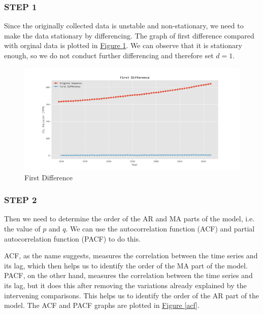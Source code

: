 \documentclass[12pt,a4paper]{article}
\begin{document}
    \subsubsection*{STEP 1}
    Since the originally collected data is unstable and non-stationary, we need to make the data stationary by differencing. The graph of first difference compared with orginal data is plotted in \hyperref[first_diff]{Figure \ref*{first_diff}}. We can observe that it is stationary enough, so we do not conduct further differencing and therefore set $d=1$.

    \begin{figure}[htbp]
        \centering
        \includegraphics[width=1\linewidth]{img/First Difference.png}
        \caption{First Difference}
        \label{first_diff}
    \end{figure}
    
    \subsubsection*{STEP 2}

    Then we need to determine the order of the AR and MA parts of the model, i.e. the value of $p$ and $q$. We can use the autocorrelation function (ACF) and partial autocorrelation function (PACF) to do this.
    
    ACF, as the name suggests, measures the correlation between the time series and its lag, which then helps us to identify the order of the MA part of the model. PACF, on the other hand, measures the correlation between the time series and its lag, but it does this after removing the variations already explained by the intervening comparisons. This helps us to identify the order of the AR part of the model. The ACF and PACF graphs are plotted in \hyperref[acf]{Figure \ref*{acf}}.
\end{document}
